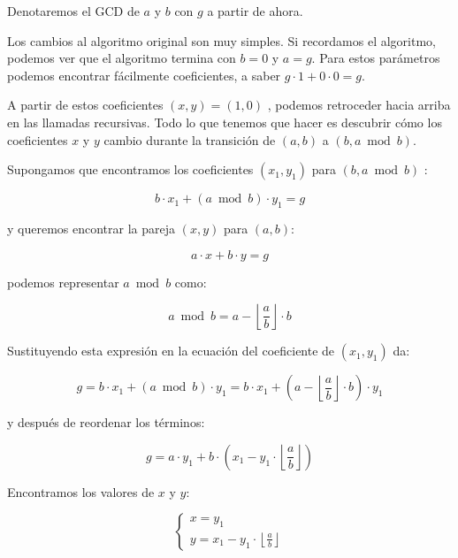 Denotaremos el GCD de $a$ y $b$ con $g$ a partir de ahora.

Los cambios al algoritmo original son muy simples. Si recordamos el algoritmo, podemos ver que el algoritmo termina con $b = 0$ y $a = g$. Para estos parámetros podemos encontrar fácilmente coeficientes, a saber $g \cdot 1 + 0 \cdot 0 = g$.

A partir de estos coeficientes $(x, y) = (1, 0)$ , podemos retroceder hacia arriba en las llamadas recursivas. Todo lo que tenemos que hacer es descubrir cómo los coeficientes $x$ y $y$ cambio durante la transición de $(a, b)$ a $(b, a \bmod b)$.

Supongamos que encontramos los coeficientes $(x_1, y_1)$ para $(b, a \bmod b)$ :

$$b \cdot x_1 + (a \bmod b) \cdot y_1 = g$$

y queremos encontrar la pareja $(x, y)$ para $(a, b)$:

$$a \cdot x + b \cdot y = g$$

podemos representar $a \bmod b$ como:

$$a \bmod b = a - \left\lfloor \frac{a}{b} \right\rfloor \cdot b$$

Sustituyendo esta expresión en la ecuación del coeficiente de $(x_1, y_1)$ da:

$$g = b \cdot x_1 + (a \bmod b) \cdot y_1 = b \cdot x_1 + \left(a - \left\lfloor \frac{a}{b} \right\rfloor \cdot b \right) \cdot y_1$$

y después de reordenar los términos:

$$g = a \cdot y_1 + b \cdot \left( x_1 - y_1 \cdot \left\lfloor \frac{a}{b} \right\rfloor \right)$$

Encontramos los valores de $x$ y $y$:

$$\begin{cases}
	x = y_1 \\
	y = x_1 - y_1 \cdot \left\lfloor \frac{a}{b} \right\rfloor
\end{cases}$$